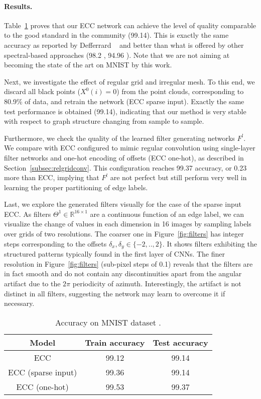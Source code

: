 \documentclass[10pt,twocolumn,letterpaper]{article}
\begin{document}
\paragraph*{Results.} Table~\ref{tab:resmnist} proves that our ECC network can achieve the level of quality comparable to the good standard in the community (99.14). This is exactly the same accuracy as reported by Defferrard \etal~\cite{defferrard16} and better than what is offered by other spectral-based approaches (98.2 \cite{bruna13}, 94.96 \cite{edwards16}). Note that we are not aiming at becoming the state of the art on MNIST by this work. 

Next, we investigate the effect of regular grid and irregular mesh. To this end, we discard all black points ($X^0(i)=0$) from the point clouds, corresponding to 80.9\% of data, and retrain the network (ECC sparse input). Exactly the same test performance is obtained (99.14), indicating that our method is very stable with respect to graph structure changing from sample to sample.

Furthermore, we check the quality of the learned filter generating networks $F^l$. We compare with ECC configured to mimic regular convolution using single-layer filter networks and one-hot encoding of offsets (ECC one-hot), as described in Section~\ref{subsec:relgridconv}. This configuration reaches 99.37 accuracy, or 0.23 more than ECC, implying that $F^l$ are not perfect but still perform very well in learning the proper partitioning of edge labels.

Last, we explore the generated filters visually for the case of the sparse input ECC. As filters $\Theta^1 \in \mathbb{R}^{16\times 1}$ are a continuous function of an edge label, we can visualize the change of values in each dimension in 16 images by sampling labels over grids of two resolutions. The coarser one in Figure~\ref{fig:filters} has integer steps corresponding to the offsets $\delta_x,\delta_y\in\{-2,..,2\}$. It shows filters exhibiting the structured patterns typically found in the first layer of CNNs. The finer resolution in Figure~\ref{fig:filters} (sub-pixel steps of 0.1) reveals that the filters are in fact smooth and do not contain any discontinuities apart from the angular artifact due to the $2\pi$ periodicity of azimuth. Interestingly, the artifact is not distinct in all filters, suggesting the network may learn to overcome it if necessary. 


\begin{table}[bt]
\centering
\begin{tabular}{ccc}
\toprule
Model & Train accuracy & Test accuracy\tabularnewline
\midrule
ECC & 99.12 & 99.14 \tabularnewline
ECC (sparse input) & 99.36 & 99.14 \tabularnewline
ECC (one-hot) & 99.53 & 99.37\tabularnewline
\bottomrule
\end{tabular}
\vspace{1.5ex}
\caption{\label{tab:resmnist} Accuracy on MNIST dataset \cite{mnist}.}
\end{table}
\end{document}
